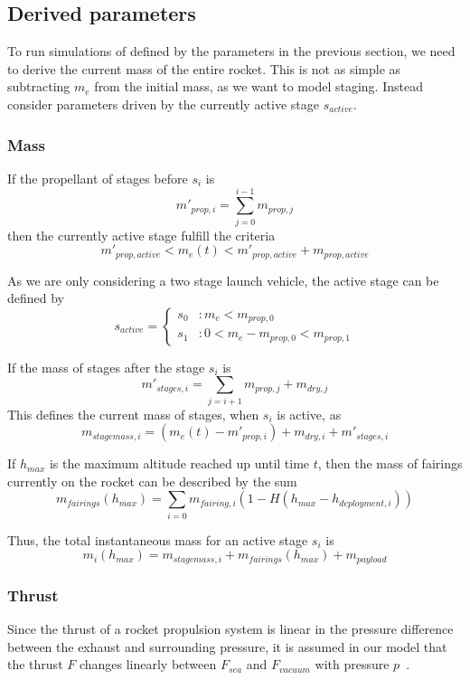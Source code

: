\documentclass[11pt]{article}
\begin{document}
\subsection{Derived parameters}
To run simulations of defined by the parameters in the previous section, 
we need to derive the current mass of the entire rocket. This is not as simple as subtracting $m_e$ from the initial mass, as we want to model staging.
Instead consider parameters driven by the currently active stage $s_{active}$.

\subsubsection{Mass}

If the propellant of stages before $s_i$ is
$$
m'_{prop,i} = \sum_{j=0}^{i-1} m_{prop,j}
$$
then the currently active stage fulfill the criteria
$$
m'_{prop,active} < m_e(t) < m'_{prop,active} + m_{prop,active}
$$

As we are only considering a two stage launch vehicle, the active stage can be defined by
$$
s_{active} = \begin{cases} 
  s_0 & : m_e < m_{prop,0} \\
  s_1 & : 0 < m_e - m_{prop,0} < m_{prop,1}
\end{cases}
$$

If the mass of stages after the stage $s_i$ is
$$
m'_{stages,i} = \sum_{j=i+1} m_{prop,j} + m_{dry,j}
$$
This defines the current mass of stages, when $s_{i}$ is active, as
$$
m_{stagemass,i} = \left( m_e(t) - m'_{prop,i} \right) + m_{dry,i} + m'_{stages,i}
$$

If $h_{max}$ is the maximum altitude reached up until time $t$, then the mass of fairings currently on the rocket can be described by the sum
$$
m_{fairings}(h_{max}) = \sum_{i=0} m_{fairing,i} (1 - H(h_{max} - h_{deployment,i}))
$$

Thus, the total instantaneous mass for an active stage $s_i$ is
$$
m_i(h_{max}) = m_{stagemass,i} + m_{fairings}(h_{max}) + m_{payload}
$$

\subsubsection{Thrust}

Since the thrust of a rocket propulsion system is linear in the pressure difference between the exhaust and surrounding pressure, 
it is assumed in our model that the thrust $F$ changes linearly between $F_{sea}$ and $F_{vacuum}$ with pressure $p$~\cite{thrust}.
%
%
\end{document}
